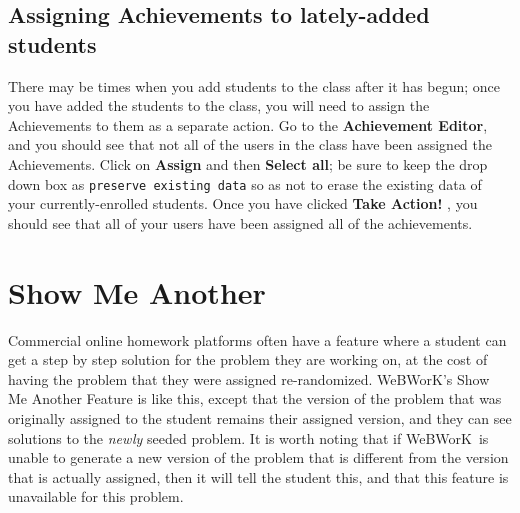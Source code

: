 \documentclass[12pt]{article}
\newcommand{\menu}[1]{\textbf{#1}}
\newcommand{\WW}{WeBWorK}
\begin{document}
\subsection{Assigning Achievements to lately-added students}\label{achievementslateaddstudents}
There may be times when you add students to the class after it has begun; once you have added the students to the class, you will need to assign the Achievements to them as a separate action.
Go to the \menu{Achievement Editor}, and you should see that not all of the users in the class have been assigned the Achievements.
Click on \menu{Assign} and then \menu{Select all}; be sure to keep the drop down box as \texttt{preserve existing data} so as not to erase the existing data of your currently-enrolled students.
Once you have clicked \menu{Take Action!
}, you should see that all of your users have been assigned all of the achievements.

\section{Show Me Another}\label{SMA}

Commercial online homework platforms often have a feature where a student can get a step by step solution for the problem they are working on, at the cost of having the problem that they were assigned re-randomized.
\WW's Show Me Another Feature is like this, except that the version of the problem that was originally assigned to the student remains their assigned version, and they can see solutions to the \emph{newly} seeded problem.
It is worth noting that if \WW\ is unable to generate a new version of the problem that is different from the version that is actually assigned, then it will tell the student this, and that this feature is unavailable for this problem.
\end{document}
